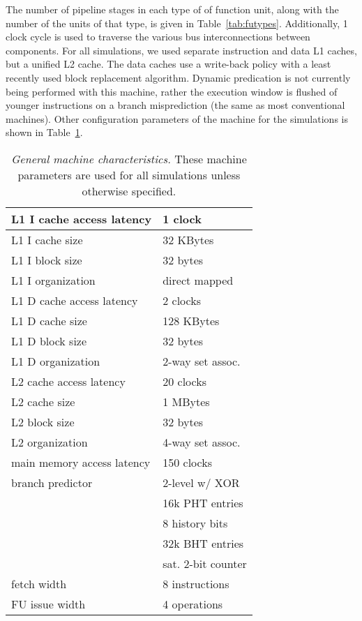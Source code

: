 \documentclass[10pt,dvips]{article}
\begin{document}
The number of pipeline stages in each type of
of function unit, along with the number of the units of that
type, is given in Table~\ref{tab:futypes}.
Additionally, 1 clock cycle is used to traverse the
various bus interconnections between components.
For all simulations, we used separate instruction and
data L1 caches, but a unified L2 cache.
The data caches use a write-back policy with a least recently used
block replacement algorithm.
Dynamic predication is not
currently being performed with this machine, rather
the execution window is flushed of younger instructions
on a branch misprediction (the same as most conventional machines).
Other configuration parameters of the machine for the
simulations is shown in Table~\ref{tab:baseline}.

%
\begin{table}
\begin{center}
\caption{{\em General machine characteristics.}
These machine parameters are used for all simulations
unless otherwise specified.}
\label{tab:baseline}
\scriptsize{
\begin{tabular}{|l|l|}
\hline 
L1 I cache access latency&1 clock\\
\hline
L1 I cache size&32 KBytes\\
\hline
L1 I block size&32 bytes\\
\hline
L1 I organization&direct mapped\\
%
\hline 
L1 D cache access latency&2 clocks\\
\hline
L1 D cache size&128 KBytes\\
\hline
L1 D block size&32 bytes\\
\hline
L1 D organization&2-way set assoc.\\
%
\hline
L2 cache access latency&20 clocks\\
\hline
L2 cache size&1 MBytes\\
\hline
L2 block size&32 bytes\\
\hline
L2 organization&4-way set assoc.\\
%
\hline
main memory access latency&150 clocks\\
\hline
branch predictor&2-level w/ XOR\\
\cline{2-2}
 & 16k PHT entries\\
\cline{2-2}
 & 8 history bits\\
\cline{2-2}
 & 32k BHT entries\\
\cline{2-2}
 & sat. 2-bit counter\\
\hline
fetch width & 8 instructions \\
\hline
FU issue width & 4 operations \\
\hline 
\end{tabular}
}
\end{center}
\end{table}
%
\end{document}
